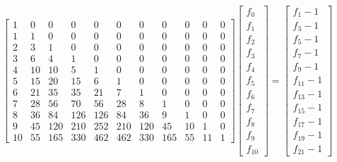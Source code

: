 \documentclass[a4paper,dottedtoc,headinclude,footinclude]{report} %
\theoremstyle{plain}
\begin{document}
    \begin{displaymath}
        \left[\begin{array}{ccccccccccc}
            1 & 0 & 0 & 0 & 0 & 0 & 0 & 0 & 0 & 0 & 0\\
            1 & 1 & 0 & 0 & 0 & 0 & 0 & 0 & 0 & 0 & 0\\
            2 & 3 & 1 & 0 & 0 & 0 & 0 & 0 & 0 & 0 & 0\\
            3 & 6 & 4 & 1 & 0 & 0 & 0 & 0 & 0 & 0 & 0\\
            4 & 10 & 10 & 5 & 1 & 0 & 0 & 0 & 0 & 0 & 0\\
            5 & 15 & 20 & 15 & 6 & 1 & 0 & 0 & 0 & 0 & 0\\
            6 & 21 & 35 & 35 & 21 & 7 & 1 & 0 & 0 & 0 & 0\\
            7 & 28 & 56 & 70 & 56 & 28 & 8 & 1 & 0 & 0 & 0\\
            8 & 36 & 84 & 126 & 126 & 84 & 36 & 9 & 1 & 0 & 0\\
            9 & 45 & 120 & 210 & 252 & 210 & 120 & 45 & 10 & 1 & 0\\
            10 & 55 & 165 & 330 & 462 & 462 & 330 & 165 & 55 & 11 & 1
            \end{array}\right]\left[
            \begin{array}{c}
                f_{0}\\
                f_{1}\\
                f_{2}\\
                f_{3}\\
                f_{4}\\
                f_{5}\\
                f_{6}\\
                f_{7}\\
                f_{8}\\
                f_{9}\\
                f_{10}
            \end{array}\right]=\left[
            \begin{array}{c}
                f_{1} - 1\\
                f_{3} - 1\\
                f_{5} - 1\\
                f_{7} - 1\\
                f_{9} - 1\\
                f_{11} - 1\\
                f_{13} - 1\\
                f_{15} - 1\\
                f_{17} - 1\\
                f_{19} - 1\\
                f_{21} - 1
            \end{array}\right]
    \end{displaymath}
\end{document}

